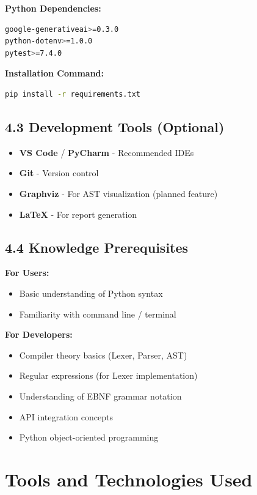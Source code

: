 \documentclass[a4paper,11pt]{article}
\begin{document}
\textbf{Python Dependencies:}
\begin{lstlisting}[language=bash, caption=requirements.txt]
google-generativeai>=0.3.0
python-dotenv>=1.0.0
pytest>=7.4.0
\end{lstlisting}

\textbf{Installation Command:}
\begin{lstlisting}[language=bash]
pip install -r requirements.txt
\end{lstlisting}

\subsection{4.3 Development Tools (Optional)}

\begin{itemize}[leftmargin=*]
    \item \textbf{VS Code} / \textbf{PyCharm} - Recommended IDEs
    \item \textbf{Git} - Version control
    \item \textbf{Graphviz} - For AST visualization (planned feature)
    \item \textbf{LaTeX} - For report generation
\end{itemize}

\subsection{4.4 Knowledge Prerequisites}

\textbf{For Users:}
\begin{itemize}
    \item Basic understanding of Python syntax
    \item Familiarity with command line / terminal
\end{itemize}

\textbf{For Developers:}
\begin{itemize}
    \item Compiler theory basics (Lexer, Parser, AST)
    \item Regular expressions (for Lexer implementation)
    \item Understanding of EBNF grammar notation
    \item API integration concepts
    \item Python object-oriented programming
\end{itemize}

\clearpage

\section{Tools and Technologies Used}
\end{document}
